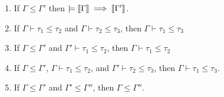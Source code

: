 \begin{lemma} %
  \label{lem:subtype-transitive}
  \leavevmode
  \begin{enumerate}
  \item \label{part:sub-env-impl} If $\Gamma  \leq  \Gamma'$ then $\models   \left\llbracket{ \Gamma }\right\rrbracket   \implies   \left\llbracket{ \Gamma' }\right\rrbracket $.
  \item \label{part:single-env-trans} If $\Gamma  \vdash  \tau_{{\mathrm{1}}}  \leq  \tau_{{\mathrm{2}}}$ and $\Gamma  \vdash  \tau_{{\mathrm{2}}}  \leq  \tau_{{\mathrm{3}}}$, then $\Gamma  \vdash  \tau_{{\mathrm{1}}}  \leq  \tau_{{\mathrm{3}}}$
  \item \label{part:env-sup-subtype} If $\Gamma  \leq  \Gamma'$ and $\Gamma'  \vdash  \tau_{{\mathrm{1}}}  \leq  \tau_{{\mathrm{2}}}$, then $\Gamma  \vdash  \tau_{{\mathrm{1}}}  \leq  \tau_{{\mathrm{2}}}$
  \item \label{part:env-sub-trans} If $\Gamma  \leq  \Gamma'$,  $\Gamma  \vdash  \tau_{{\mathrm{1}}}  \leq  \tau_{{\mathrm{2}}}$, and $\Gamma'  \vdash  \tau_{{\mathrm{2}}}  \leq  \tau_{{\mathrm{3}}}$, then $\Gamma  \vdash  \tau_{{\mathrm{1}}}  \leq  \tau_{{\mathrm{3}}}$.
  \item If $\Gamma  \leq  \Gamma'$ and $\Gamma'  \leq  \Gamma''$, then $\Gamma  \leq  \Gamma''$.
  \end{enumerate}
\end{lemma}

